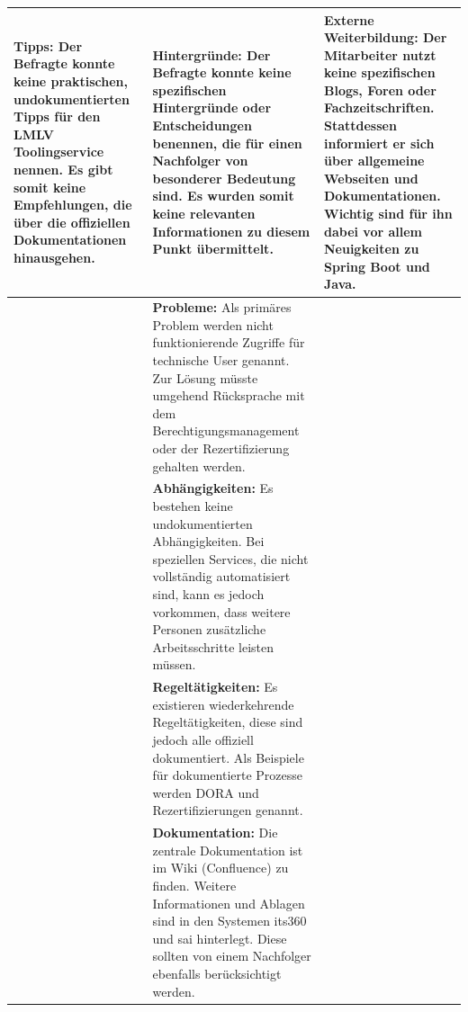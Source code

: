 \documentclass[
  10pt,
  ngerman,
  a4paper,
  toc=graduated,
  numbers=noenddot,
  headings=standardclasses,
  nonumberlist
]{scrartcl}
\begin{document}
{\begin{longtable}{|L{0.31\textwidth}|L{0.31\textwidth}|L{0.31\textwidth}|}
\textbf{Tipps:}\newline
Der Befragte konnte keine praktischen, undokumentierten Tipps für den LMLV Toolingservice nennen. Es gibt somit keine Empfehlungen, die über die offiziellen Dokumentationen hinausgehen.
&
\textbf{Hintergründe:}\newline
Der Befragte konnte keine spezifischen Hintergründe oder Entscheidungen benennen, die für einen Nachfolger von besonderer Bedeutung sind. Es wurden somit keine relevanten Informationen zu diesem Punkt übermittelt.
&
\textbf{Externe Weiterbildung:}\newline
Der Mitarbeiter nutzt keine spezifischen Blogs, Foren oder Fachzeitschriften. Stattdessen informiert er sich über allgemeine Webseiten und Dokumentationen. Wichtig sind für ihn dabei vor allem Neuigkeiten zu Spring Boot und Java.
\\
\hline

&
\textbf{Probleme:}\newline
Als primäres Problem werden nicht funktionierende Zugriffe für technische User genannt. Zur Lösung müsste umgehend Rücksprache mit dem Berechtigungsmanagement oder der Rezertifizierung gehalten werden.
&
\\
\hline

&
\textbf{Abhängigkeiten:}\newline
Es bestehen keine undokumentierten Abhängigkeiten. Bei speziellen Services, die nicht vollständig automatisiert sind, kann es jedoch vorkommen, dass weitere Personen zusätzliche Arbeitsschritte leisten müssen.
&
\\
\hline

&
\textbf{Regeltätigkeiten:}\newline
Es existieren wiederkehrende Regeltätigkeiten, diese sind jedoch alle offiziell dokumentiert. Als Beispiele für dokumentierte Prozesse werden DORA und Rezertifizierungen genannt.
&
\\
\hline

&
\textbf{Dokumentation:}\newline
Die zentrale Dokumentation ist im Wiki (Confluence) zu finden. Weitere Informationen und Ablagen sind in den Systemen its360 und sai hinterlegt. Diese sollten von einem Nachfolger ebenfalls berücksichtigt werden.
&
\\
\hline

\end{longtable}
}
\end{document}
